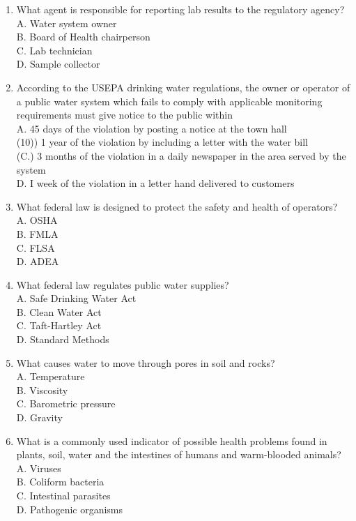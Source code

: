 \documentclass[10pt]{article}
\begin{document}
\begin{enumerate}
  \item What agent is responsible for reporting lab results to the regulatory agency?\\
A. Water system owner\\
B. Board of Health chairperson\\
C. Lab technician\\
D. Sample collector

  \item According to the USEPA drinking water regulations, the owner or operator of a public water system which fails to comply with applicable monitoring requirements must give notice to the public within\\
A. 45 days of the violation by posting a notice at the town hall\\
(10)) 1 year of the violation by including a letter with the water bill\\
(C.) 3 months of the violation in a daily newspaper in the area served by the system\\
D. I week of the violation in a letter hand delivered to customers

  \item What federal law is designed to protect the safety and health of operators?\\
A. OSHA\\
B. FMLA\\
C. FLSA\\
D. ADEA

  \item What federal law regulates public water supplies?\\
A. Safe Drinking Water Act\\
B. Clean Water Act\\
C. Taft-Hartley Act\\
D. Standard Methods

  \item What causes water to move through pores in soil and rocks?\\
A. Temperature\\
B. Viscosity\\
C. Barometric pressure\\
D. Gravity

  \item What is a commonly used indicator of possible health problems found in plants, soil, water and the intestines of humans and warm-blooded animals?\\
A. Viruses\\
B. Coliform bacteria\\
C. Intestinal parasites\\
D. Pathogenic organisms


\end{enumerate}
\end{document}
